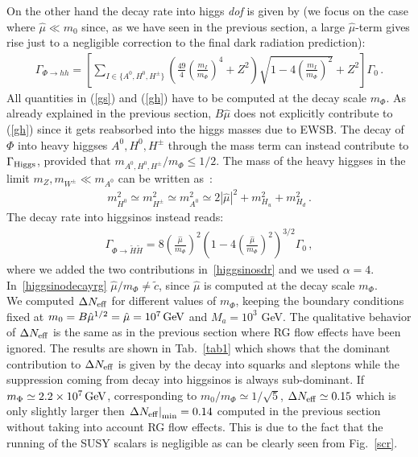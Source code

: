 \documentclass[12pt,a4paper]{book}
\begin{document}
On the other hand the decay rate into higgs \textit{dof} is given by (we focus on the case where $\hat\mu\ll m_0$ since, as we have seen in the previous section, a large $\hat\mu$-term gives rise just to a negligible correction to the final dark radiation prediction):
\begin{align}
\label{gh}
\Gamma_{\Phi \rightarrow hh} = \left[\sum_{I \in \{A^0, H^0, H^\pm\}} \left(\frac{49}{4} \left(\frac{m_{I}}{m_{\Phi}} \right)^4 + Z^2 \right) \sqrt{1 - 4 \left(\frac{m_{I}}{m_{\Phi}}\right)^2} + Z^2\right]\Gamma_0\, .
\end{align}
All quantities in (\ref{gs}) and (\ref{gh}) have to be computed at the decay scale $m_\Phi$. As already explained in the previous section, $B\hat\mu$ does not explicitly contribute to (\ref{gh}) since it gets reabsorbed into the higgs masses due to EWSB. The decay of $\Phi$ into heavy higgses $A^0, H^0, H^\pm$ through the mass term can instead contribute to $\Gamma_{\rm Higgs}$, provided that $m_{A^0, H^0, H^\pm}/m_\Phi \leq 1/2$. The mass of the heavy higgses in the limit $m_Z, m_{W^\pm} \ll m_{A^0}$ can be written as~\cite{Martin:1997ns}:
\begin{align}
m_{H^0}^2 \simeq m_{H^\pm}^2 \simeq m_{A^0}^2 \simeq 2 |\hat\mu|^2 + m_{H_u}^2 + m_{H_d}^2 \,.
\end{align}
The decay rate into higgsinos instead reads:
\begin{align}
\Gamma_{\Phi \rightarrow \tilde{H} \tilde{H}} = 8 \left(\frac{\hat\mu}{m_\Phi}\right)^2 \left(1 - 4 \left(\frac{\hat\mu}{m_\Phi}\right)^2\right)^{3/2} \Gamma_0 \,,
\label{higgsinodecayrg}
\end{align}
where we added the two contributions in~\eqref{higgsinosdr} and we used $\alpha = 4$. In~\eqref{higgsinodecayrg} $\hat\mu/m_\Phi \neq \tilde{c}$, since $\hat\mu$ is computed at the decay scale $m_\Phi$.\\

We computed $\Delta N_{\rm eff}$ for different values of $m_\Phi$, keeping the boundary conditions fixed at $m_0 = B\hat\mu^{1/2} = \hat\mu = 10^7 \, \rm GeV$ and $M_a = 10^3$ GeV. The qualitative behavior of $\Delta N_{\rm eff}$ is the same as in the previous section where RG flow effects have been ignored. The results are shown in Tab.~\ref{tab1} which shows that the dominant contribution to $\Delta N_{\rm eff}$ is given by the decay into squarks and sleptons while the suppression coming from decay into higgsinos is always sub-dominant. If $m_\Phi \simeq 2.2 \times 10^7 \, \rm GeV$, corresponding to $m_0/m_\Phi \simeq 1/\sqrt{5}$, $\Delta N_{\rm eff} \simeq 0.15$ which is only slightly larger then $\left.\Delta N_{\rm eff}\right|_{\rm min} = 0.14$ computed in the previous section without taking into account RG flow effects. This is due to the fact that the running of the SUSY scalars is negligible as can be clearly seen from Fig.~\ref{scr}.
\end{document}
